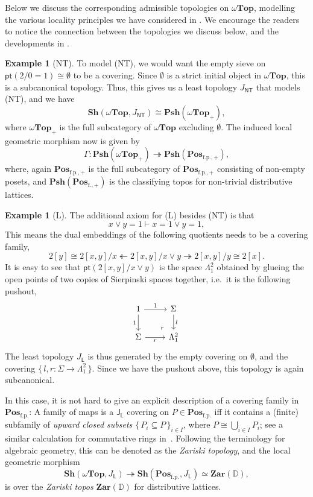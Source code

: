 \documentclass[12pt]{amsart}
\theoremstyle{definition}
\newtheorem{example}[theorem]{Example}
\newcommand{\mb}[1]{\mathbf{#1}}
\newcommand{\mbb}[1]{\mathbb{#1}}
\newcommand{\mr}[1]{\mathrm{#1}}
\newcommand{\ms}[1]{\mathsf{#1}}
\newcommand{\Pos}{\mb{Pos}}
\newcommand{\sh}{\mb{Sh}}
\newcommand{\psh}{\mb{Psh}}
\newcommand{\set}[1]{\{\,#1\,\}}
\newcommand{\surj}{\twoheadrightarrow}
\newcommand{\fp}{_{\mr{f.p.}}}
\newcommand{\emp}{\emptyset}
\newcommand{\pt}{\ms{pt}}
\newcommand{\wTop}{\omega\mb{Top}}
\begin{document}
Below we discuss the corresponding admissible topologies on $\wTop$, modelling the various locality principles we have considered in . We encourage the readers to notice the connection between the topologies we discuss below, and the developments in .

\begin{example}[NT]
  To model (NT), we would want the empty sieve on $\pt(2/0=1) \cong \emp$ to be a covering. Since $\emp$ is a strict initial object in $\wTop$, this is a subcanonical topology. Thus, this gives us a least topology $J_{\ms{NT}}$ that models (NT), and we have
  \[ \sh(\wTop,J_{\ms{NT}}) \cong \psh(\wTop_+), \]
  where $\wTop_+$ is the full subcategory of $\wTop$ excluding $\emp$. The induced local geometric morphism now is given by 
  \[ \Gamma : \psh(\wTop_+) \surj \psh(\Pos_{\mr{f.p.,+}}), \]
  where, again $\Pos_{\mr{f.p.,+}}$ is the full subcategory of $\Pos_{\mr{f.p.,+}}$ consisting of non-empty posets, and $\psh(\Pos_{\mr{f.,+}})$ is the classifying topos for non-trivial distributive lattices.
\end{example}

\begin{example}[L]
  The additional axiom for (L) besides (NT) is that 
  \[ x \vee y = 1 \vdash x = 1 \vee y = 1, \] 
  This means the dual embeddings of the following quotients needs to be a covering family,
  \[ 2[y] \cong 2[x,y]/x \twoheadleftarrow 2[x,y]/x\vee y \surj 2[x,y]/y \cong 2[x]. \]
  It is easy to see that $\pt(2[x,y]/x \vee y)$ is the space $\Lambda^2_1$ obtained by glueing the open points of two copies of Sierpinski spaces together, i.e.\ it is the following pushout,
  \[
  \begin{tikzcd}
    1 \ar[d, "1"'] \ar[r, "1"] & \Sigma \ar[d, "l"] \\ 
    \Sigma \ar[r, "r"'] & \Lambda^2_1
    \arrow["\lrcorner"{anchor=center, pos=0.125, rotate=180}, draw=none, from=2-2, to=1-1]    
  \end{tikzcd}
  \]
  The least topology $J_{\ms L}$ is thus generated by the empty covering on $\emp$, and the covering $\set{l,r : \Sigma \to \Lambda^2_1}$. Since we have the pushout above, this topology is again subcanonical. 
  
  In this case, it is not hard to give an explicit description of a covering family in $\Pos\fp$: A family of maps is a $\ms J_{\ms L}$ covering on $P \in \Pos\fp$ iff it contains a (finite) subfamily of \emph{upward closed subsets} $\set{P_i\subseteq P}_{i\in I}$, where $P \cong \bigcup_{i\in I}P_i$; see a similar calculation for commutative rings in~\cite[VIII. 6]{maclane2012sheaves}. Following the terminology for algebraic geometry, this can be denoted as the \emph{Zariski topology}, and the local geometric morphism
  \[ \sh(\wTop,J_{\ms L}) \surj \sh(\Pos\fp,J_{\ms L}) \simeq \mb{Zar}(\mbb D), \]
  is over the \emph{Zariski topos} $\mb{Zar}(\mbb D)$ for distributive lattices.
\end{example}
\end{document}
